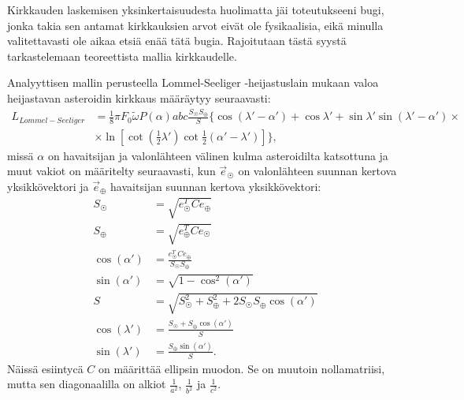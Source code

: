 \documentclass[12pt,a4paper,titlepage]{article}
\begin{document}
Kirkkauden laskemisen yksinkertaisuudesta huolimatta jäi toteutukseeni bugi, jonka takia sen antamat kirkkauksien arvot eivät ole fysikaalisia, eikä minulla valitettavasti ole aikaa etsiä enää tätä bugia. Rajoitutaan tästä syystä tarkastelemaan teoreettista mallia kirkkaudelle.

Analyyttisen mallin perusteella Lommel-Seeliger -heijastuslain mukaan valoa heijastavan asteroidin kirkkaus määräytyy seuraavasti:
\begin{align}
	L_{Lommel-Seeliger} &= \frac{1}{8} \pi F_0 \widetilde{\omega} P(\alpha)abc\frac{S_{\astrosun} S_{\oplus}}{S} \{ \cos(\lambda'-\alpha') + \cos\lambda' + \sin \lambda' \sin(\lambda'-\alpha') \times\nonumber\\
	&\times\ln\left[\cot(\frac{1}{2}\lambda')\cot\frac{1}{2}(\alpha'-\lambda')\right] \},
\end{align}
missä $\alpha$ on havaitsijan ja valonlähteen välinen kulma asteroidilta katsottuna ja muut vakiot on määritelty seuraavasti, kun $\vec{e}_{\astrosun}$ on valonlähteen suunnan kertova yksikkövektori ja $\vec{e}_{\oplus}$ havaitsijan suunnan kertova yksikkövektori: 
\begin{align*}
	S_{\astrosun} &= \sqrt{e_{\astrosun}^TCe_{\oplus}} \\
	S_{\oplus} &= \sqrt{e_{\oplus}^TCe_{\astrosun}} \\
	\cos(\alpha') &= \frac{e_{\astrosun}^TCe_{\oplus}}{S_{\astrosun}S_{\oplus}} \\
	\sin(\alpha') &= \sqrt{1-\cos^2(\alpha')} \\
	S &= \sqrt{S_{\astrosun}^2+S_{\oplus}^2+2S_{\astrosun}S_{\oplus}\cos(\alpha')} \\
	\cos(\lambda') &= \frac{S_{\astrosun}+S_{\oplus}\cos(\alpha')}{S} \\
	\sin(\lambda') &= \frac{S_{\oplus}\sin(\alpha')}{S}.
\end{align*}
Näissä esiintycä $C$ on määrittää ellipsin muodon. Se on muutoin nollamatriisi, mutta sen diagonaalilla on alkiot $\frac{1}{a^2}$, $\frac{1}{b^2}$ ja $\frac{1}{c^2}$. \cite{murri}

\newpage

\end{document}
